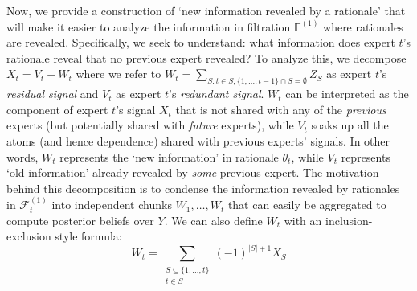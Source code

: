 \documentclass{winnower}
\begin{document}
Now, we provide a construction of `new information revealed by a rationale' that will make it easier to analyze the information in filtration $\mathbb{F}^{(1)}$ where rationales are revealed. Specifically, we seek to understand: what information does expert $t$'s rationale reveal that no previous expert revealed? To analyze this, we decompose $X_t = V_t + W_t$ where we refer to $W_t = \sum_{S: t\in S, \{1, \ldots, t-1\} \cap S = \emptyset} Z_S$ as expert $t$'s \emph{residual signal} and $V_t$ as expert $t$'s \emph{redundant signal}. $W_t$ can be interpreted as the component of expert $t$'s signal $X_t$ that is not shared with any of the \emph{previous} experts (but potentially shared with \emph{future} experts), while $V_t$ soaks up all the atoms (and hence dependence) shared with previous experts' signals. In other words, $W_t$ represents the `new information' in rationale $\theta_t$, while $V_t$ represents `old information' already revealed by \emph{some} previous expert. The motivation behind this decomposition is to condense the information revealed by rationales in $\mathcal{F}_t^{(1)}$ into independent chunks $W_1, \ldots, W_t$ that can easily be aggregated to compute posterior beliefs over $Y$. We can also define $W_t$ with an inclusion-exclusion style formula:
\begin{equation}
    W_t = \sum_{\substack{S \subseteq \{1, \ldots, t\} \\ t\in S}} (-1)^{|S|+1} X_S
\end{equation}
\end{document}
